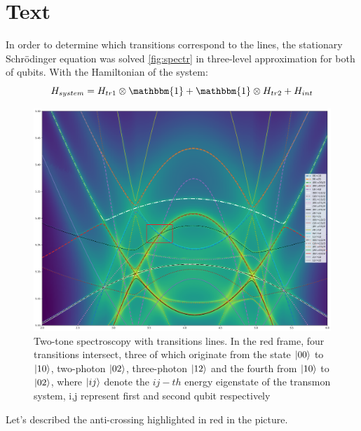 \documentclass[%
 aip,
 amsmath,amssymb,
 reprint,%
]{revtex4-1}
\begin{document}
\section{Text}


In order to determine which transitions correspond to the lines, the stationary Schrödinger equation was solved \autoref{fig:spectr} in three-level approximation for both of qubits. With the Hamiltonian of the system:
\begin{equation}
	H_{system} = H_{tr1}\otimes\mathbbm{1}+\mathbbm{1}\otimes H_{tr2}+H_{int}
\end{equation}
\begin{figure}[h]
	\centering
	\includegraphics[width=\linewidth]{spectr}
	\caption{Two-tone spectroscopy with transitions lines. In the red frame, four transitions intersect, three of which originate from the state $\ket{00}$ to $\ket{10}$, two-photon
		$\ket{02}$, three-photon
		$\ket{12}$ and the fourth from  $\ket{10}$ to  $\ket{02}$, where $\ket{ij}$ denote the $ij-th$ energy eigenstate of the transmon system, i,j represent first and second qubit respectively}
	\label{fig:spectr}
\end{figure}


 Let's described the anti-crossing highlighted in red in the picture. 
 
 

\end{document}

